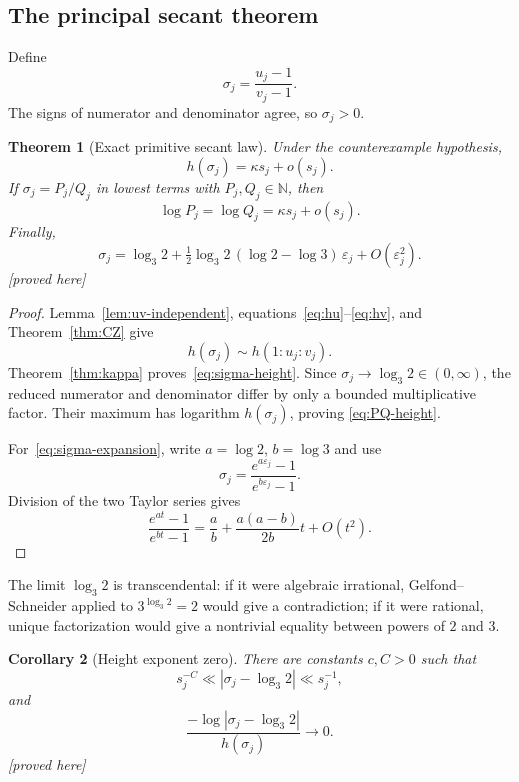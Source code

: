 \documentclass[11pt,oneside]{article}
\newtheorem{theorem}{Theorem}[section]
\newtheorem{corollary}[theorem]{Corollary}
\theoremstyle{definition}
\theoremstyle{remark}
\newcommand{\N}{\mathbb N}
\newcommand{\eps}{\varepsilon}
\newcommand{\proved}{\textcolor{deepgreen}{\textsf{[proved here]}}}
\begin{document}
\subsection{The principal secant theorem}

Define
\begin{equation}
 \sigma_j=\frac{u_j-1}{v_j-1}.
 \label{eq:sigma}
\end{equation}
The signs of numerator and denominator agree, so $\sigma_j>0$.

\begin{theorem}[Exact primitive secant law]
\label{thm:secant-law}
Under the counterexample hypothesis,
\begin{equation}
 h(\sigma_j)=\kappa s_j+o(s_j).
 \label{eq:sigma-height}
\end{equation}
If $\sigma_j=P_j/Q_j$ in lowest terms with $P_j,Q_j\in\N$, then
\begin{equation}
 \log P_j=\log Q_j=\kappa s_j+o(s_j).
 \label{eq:PQ-height}
\end{equation}
Finally,
\begin{equation}
 \sigma_j=\log_3 2
 +\tfrac12\log_3 2\,(\log2-\log3)\,\eps_j
 +O(\eps_j^2).
 \label{eq:sigma-expansion}
\end{equation}
\proved
\end{theorem}

\begin{proof}
Lemma~\ref{lem:uv-independent}, equations~\eqref{eq:hu}--\eqref{eq:hv}, and
Theorem~\ref{thm:CZ} give
\[
 h(\sigma_j)\sim h(1:u_j:v_j).
\]
Theorem~\ref{thm:kappa} proves~\eqref{eq:sigma-height}.  Since
$\sigma_j\to\log_3 2\in(0,\infty)$, the reduced numerator and denominator differ by only
a bounded multiplicative factor.  Their maximum has logarithm $h(\sigma_j)$, proving
\eqref{eq:PQ-height}.

For~\eqref{eq:sigma-expansion}, write $a=\log2$, $b=\log3$ and use
\[
 \sigma_j=\frac{e^{a\eps_j}-1}{e^{b\eps_j}-1}.
\]
Division of the two Taylor series gives
\[
 \frac{e^{at}-1}{e^{bt}-1}
 =\frac ab+\frac{a(a-b)}{2b}t+O(t^2).
\]
\end{proof}

The limit $\log_3 2$ is transcendental: if it were algebraic irrational,
Gelfond--Schneider applied to $3^{\log_3 2}=2$ would give a contradiction; if it were
rational, unique factorization would give a nontrivial equality between powers of $2$ and
$3$.

\begin{corollary}[Height exponent zero]
\label{cor:height-zero}
There are constants $c,C>0$ such that
\begin{equation}
 s_j^{-C}\ll
 \left|\sigma_j-\log_3 2\right|
 \ll s_j^{-1},
 \label{eq:sigma-poly}
\end{equation}
and
\begin{equation}
 \frac{-\log\left|\sigma_j-\log_3 2\right|}
      {h(\sigma_j)}\longrightarrow0.
 \label{eq:height-exponent-zero}
\end{equation}
\proved
\end{corollary}
\end{document}
